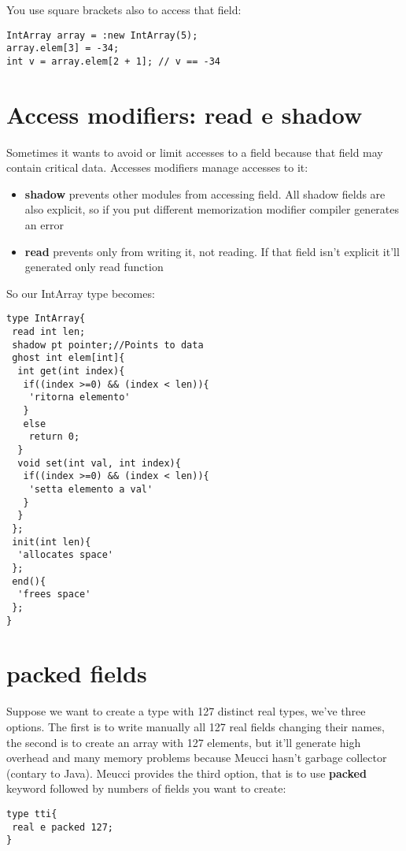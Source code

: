 \documentclass[10pt]{book}%
\renewcommand{\emph}[1]{\textbf{#1}}
\newenvironment{codeenv}{
\begin{mdframed}[backgroundcolor=black!20,topline=false,leftline=false,rightline=false,bottomline=false]
}
{\end{mdframed}}
\begin{document}
You use square brackets also to access that field:
\begin{codeenv}
\begin{verbatim}
IntArray array = :new IntArray(5);
array.elem[3] = -34;
int v = array.elem[2 + 1]; // v == -34
\end{verbatim}
\end{codeenv}

\section{Access modifiers: read e shadow}
Sometimes it wants to avoid or limit accesses to a field because that field may contain critical data. Accesses modifiers manage accesses to it:
\begin{itemize}
\item \emph{shadow} prevents other modules from accessing field. All shadow fields are also explicit, so if you put different memorization modifier compiler generates an error
\item \emph{read} prevents only from writing it, not reading. If that field isn't explicit it'll generated only read function
\end{itemize}

So our IntArray type becomes:
\begin{codeenv}
\begin{verbatim}
type IntArray{
 read int len;
 shadow pt pointer;//Points to data
 ghost int elem[int]{
  int get(int index){
   if((index >=0) && (index < len)){
    'ritorna elemento'
   }
   else
    return 0;
  }
  void set(int val, int index){
   if((index >=0) && (index < len)){
    'setta elemento a val'
   }
  }
 };
 init(int len){
  'allocates space'
 };
 end(){
  'frees space'
 };
}
\end{verbatim}
\end{codeenv}

\section{packed fields}
Suppose we want to create a type with 127 distinct real types, we've three options. The first is to write manually all 127 real fields changing their names, the second is to create an array with 127 elements, but it'll generate high overhead and many memory problems because Meucci hasn't garbage collector (contary to Java). Meucci provides the third option, that is to use \emph{packed} keyword followed by numbers of fields you want to create:
\begin{codeenv}
\begin{verbatim}
type tti{
 real e packed 127;
}
\end{verbatim}
\end{codeenv}
\end{document}
